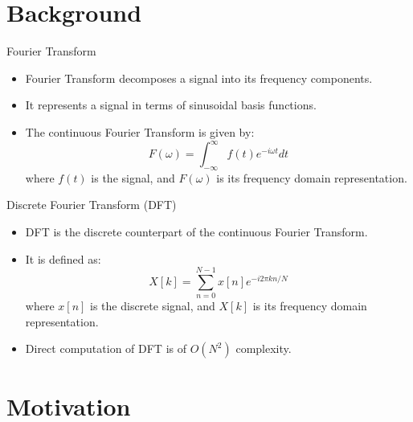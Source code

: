 \documentclass{beamer}
\begin{document}
\section{Background}
\begin{frame}{Fourier Transform}
  \begin{itemize}
    \item Fourier Transform decomposes a signal into its frequency components.
    \item It represents a signal in terms of sinusoidal basis functions.
    \item The continuous Fourier Transform is given by:
    \[ F(\omega) = \int_{-\infty}^{\infty} f(t) e^{-i\omega t} dt \]
    where $f(t)$ is the signal, and $F(\omega)$ is its frequency domain representation.
  \end{itemize}
\end{frame}

\begin{frame}{Discrete Fourier Transform (DFT)}
  \begin{itemize}
    \item DFT is the discrete counterpart of the continuous Fourier Transform.
    \item It is defined as:
    \[ X[k] = \sum_{n=0}^{N-1} x[n] e^{-i2\pi kn/N} \]
    where $x[n]$ is the discrete signal, and $X[k]$ is its frequency domain representation.
    \item Direct computation of DFT is of $O(N^2)$ complexity.
  \end{itemize}
\end{frame}

\section{Motivation}
 
\end{document}
